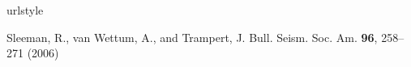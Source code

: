 \documentclass[12pt]{amsart}
\begin{document}
\begin{thebibliography}{10}
\providecommand{\url}[1]{{#1}}
\providecommand{\urlprefix}{URL }
\expandafter\ifx\csname urlstyle\endcsname\relax
  \providecommand{\doi}[1]{DOI~\discretionary{}{}{}#1}\else
  \providecommand{\doi}{DOI~\discretionary{}{}{}\begingroup
  \urlstyle{rm}\Url}\fi


Sleeman, R., van Wettum, A., and Trampert, J.
\newblock Bull. Seism. Soc. Am. \textbf{96}, 258--271 (2006)


\end{thebibliography}




%
 
\end{document}
